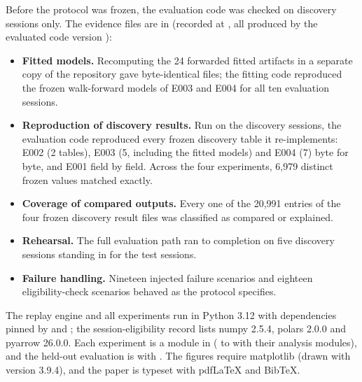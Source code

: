 \documentclass[11pt]{article}
\makeatletter
\renewcommand\section{\@startsection{section}{1}{\z@}{-3.25ex\@plus -1ex \@minus -.2ex}{1.5ex \@plus .2ex}{\normalfont\large\bfseries}}
\makeatother
\begin{document}
Before the protocol was frozen, the evaluation code was checked on discovery sessions only. The evidence files are in
 (recorded at , all produced by the evaluated code version ):
\begin{itemize}
  \item \textbf{Fitted models.} Recomputing the 24 forwarded fitted artifacts in a separate copy of the repository gave
  byte-identical files; the fitting code reproduced the frozen walk-forward models of E003 and E004 for all ten
  evaluation sessions.
  \item \textbf{Reproduction of discovery results.} Run on the discovery sessions, the evaluation code reproduced every
  frozen discovery table it re-implements: E002 (2 tables), E003 (5, including the fitted models) and E004 (7) byte for
  byte, and E001 field by field. Across the four experiments, 6{,}979 distinct frozen values matched exactly.
  \item \textbf{Coverage of compared outputs.} Every one of the 20{,}991 entries of the four frozen discovery result files
  was classified as compared or explained.
  \item \textbf{Rehearsal.} The full evaluation path ran to completion on five discovery sessions standing in for the
  test sessions.
  \item \textbf{Failure handling.} Nineteen injected failure scenarios and eighteen eligibility-check scenarios behaved as
  the protocol specifies.
\end{itemize}

\section{Software}

The replay engine and all experiments run in Python 3.12 with dependencies pinned by  and
; the session-eligibility record lists numpy 2.5.4, polars 2.0.0 and pyarrow 26.0.0. Each experiment
is a module in  ( to  with their analysis modules), and the held-out
evaluation is  with . The figures require matplotlib
(drawn with version 3.9.4), and the paper is typeset with pdf\LaTeX{} and BibTeX.
\end{document}
